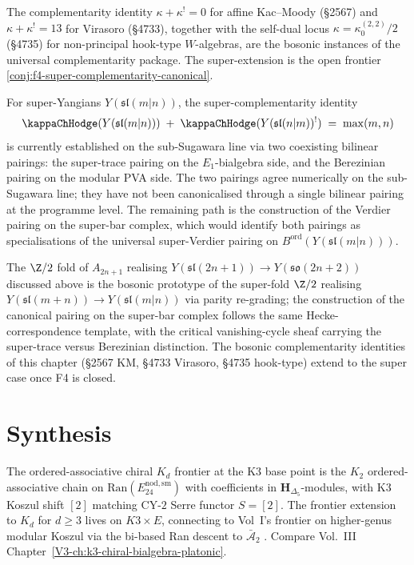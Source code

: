 The complementarity identity $\kappa + \kappa^{!} = 0$ for affine
Kac--Moody (\S2567) and $\kappa + \kappa^{!} = 13$ for Virasoro
(\S4733), together with the self-dual locus
$\kappa = \kappa_{0}^{(2,2)}/2$ (\S4735) for non-principal
hook-type $W$-algebras, are the bosonic instances of the universal
complementarity package. The super-extension is the open frontier
\cref{conj:f4-super-complementarity-canonical}.

\begin{remark}[F4 anchor: $\kappa + \kappa^{!} = \max(m, n)$ on
super-Yangians]
\label{rem:ordered-kd-frontier-anchor-f4}
For super-Yangians $Y(\mathfrak{sl}(m | n))$, the
super-complementarity identity
\[
 \kappaChHodge(Y(\mathfrak{sl}(m | n)))
 \;+\;
 \kappaChHodge(Y(\mathfrak{sl}(n | m))^{!})
 \;=\;
 \max(m, n)
\]
is currently established on the sub-Sugawara line via two
coexisting bilinear pairings: the super-trace pairing on the
$E_{1}$-bialgebra side, and the Berezinian pairing on the modular
PVA side. The two pairings agree numerically on the sub-Sugawara
line; they have not been canonicalised through a single bilinear
pairing at the programme level. The remaining path is the
construction of the Verdier pairing on the super-bar complex, which
would identify both pairings as specialisations of the universal
super-Verdier pairing on $B^{\mathrm{ord}}(Y(\mathfrak{sl}(m | n)))$.

The $\Z/2$ fold of $A_{2n + 1}$ realising
$Y(\mathfrak{sl}(2n + 1)) \to Y(\mathfrak{so}(2n + 2))$
discussed above is the bosonic prototype of the super-fold
$\Z/2$ realising
$Y(\mathfrak{sl}(m + n)) \to Y(\mathfrak{sl}(m | n))$ via parity
re-grading; the construction of the canonical pairing on the super-bar
complex follows the same Hecke-correspondence template, with the
critical vanishing-cycle sheaf carrying the super-trace versus
Berezinian distinction. The bosonic complementarity identities
of this chapter (\S2567 KM, \S4733 Virasoro, \S4735 hook-type)
extend to the super case once F4 is closed.
\end{remark}

\section{Synthesis}
\label{sec:oackdf-supplement}

\begin{remark}
\label{rem:oackdf-1}
The ordered-associative chiral $K_d$ frontier at the K3 base
point is the $K_2$ ordered-associative chain on
$\mathrm{Ran}(E^{\mathrm{nod,sm}}_{24})$ with coefficients in
$\mathbf H_{\Delta_5}$-modules, with K3 Koszul shift $[2]$ matching
CY-$2$ Serre functor $S = [2]$. The frontier extension to $K_d$ for
$d\geq 3$ lives on $K3\times E$, connecting to Vol~I's frontier on
higher-genus modular Koszul via the bi-based Ran descent to
$\bar{\mathcal A}_2$ \cite{FrancisGaitsgoryFactorization,KugaSatake1967}.
Compare Vol.~III Chapter~\ref{V3-ch:k3-chiral-bialgebra-platonic}.
\end{remark}

